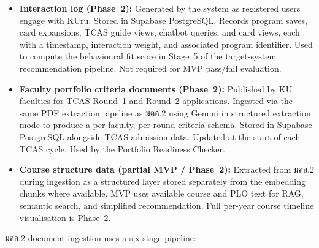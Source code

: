 \begin{itemize}[leftmargin=80pt]
    \item \textbf{Interaction log (Phase~2):} Generated by the system as registered users engage with KUru. Stored in Supabase PostgreSQL. Records program saves, card expansions, TCAS guide views, chatbot queries, and card views, each with a timestamp, interaction weight, and associated program identifier. Used to compute the behavioural fit score in Stage~5 of the target-system recommendation pipeline. Not required for MVP pass/fail evaluation.

    \item \textbf{Faculty portfolio criteria documents (Phase~2):} Published by KU faculties for TCAS Round~1 and Round~2 applications. Ingested via the same PDF extraction pipeline as มคอ.2 using Gemini in structured extraction mode to produce a per-faculty, per-round criteria schema. Stored in Supabase PostgreSQL alongside TCAS admission data. Updated at the start of each TCAS cycle. Used by the Portfolio Readiness Checker.

    \item \textbf{Course structure data (partial MVP / Phase~2):} Extracted from มคอ.2 during ingestion as a structured layer stored separately from the embedding chunks where available. MVP uses available course and PLO text for RAG, semantic search, and simplified recommendation. Full per-year course timeline visualisation is Phase~2.
\end{itemize}

มคอ.2 document ingestion uses a six-stage pipeline:

